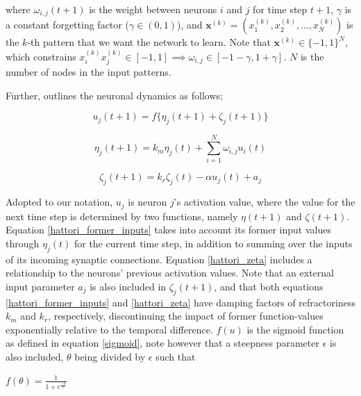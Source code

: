 where $\omega_{i,j}(t+1)$ is the weight between neurons $i$ and $j$ for time step $t+1$, $\gamma$ is a constant forgetting factor ($\gamma \in (0, 1)$), and $\textbf{x}^{(k)} = (x_1^{(k)}, x_2^{(k)}, ..., x_N^{(k)})$ is the $k$-th pattern that we want the network to learn. Note that $\textbf{x}^{(k)} \in \{-1,1\}^N$, which constrains $x_i^{(k)} x_j^{(k)} \in [-1,1] \implies \omega_{i,j} \in [-1-\gamma, 1+\gamma]$. $N$ is the number of nodes in the input patterns.

Further, \cite{Hattori2010} outlines the neuronal dynamics as follows;

\begin{equation}\label{hattori_next_output}
    u_j(t+1) = f\{\eta_j (t+1) + \zeta_j(t+1)\}
\end{equation}

\begin{equation}\label{hattori_former_inputs}
    \eta_j(t+1) = k_m \eta_j(t) + \sum_{i=1}^{N} \omega_{i,j} u_i(t)
\end{equation}

\begin{equation}\label{hattori_zeta}
    \zeta_j(t+1) = k_r \zeta_j(t) - \alpha u_j(t) + a_j
\end{equation}

Adopted to our notation, $u_j$ is neuron $j$'s activation value, where the value for the next time step is determined by two functions, namely $\eta(t+1)$ and $\zeta(t+1)$. Equation \ref{hattori_former_inputs} takes into account its former input values through $\eta_j(t)$ for the current time step, in addition to summing over the inputs of its incoming synaptic connections. Equation \ref{hattori_zeta} includes a relationship to the neurons' previous activation values. Note that an external input parameter $a_j$ is also included in $\zeta_j(t+1)$, and that both equations \ref{hattori_former_inputs} and \ref{hattori_zeta} have damping factors of refractoriness $k_m$ and $k_r$, respectively, discontinuing the impact of former function-values exponentially relative to the temporal difference. $f(u)$ is the sigmoid function as defined in equation \ref{sigmoid}, note however that a steepness parameter $\epsilon$ is also included, $\theta$ being divided by $\epsilon$ such that

\begin{center}
\begin{math}
    f(\theta) = \frac{1}{1 + e^{\frac{-\theta}{\epsilon}}}
\end{math}
\end{center}

